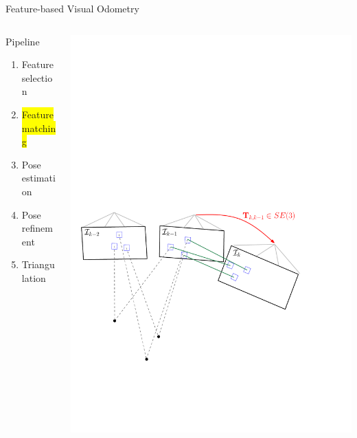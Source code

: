 \documentclass[10pt]{beamer}
\begin{document}
\begin{frame}{Feature-based Visual Odometry}
	\begin{columns}
	  \begin{column}{0.4\textwidth}
	  	\begin{block}{Pipeline}
		  	\begin{enumerate}
				\item Feature selection
				\item \colorbox{yellow}{Feature matching }
				\item Pose estimation
				\item Pose refinement
				\item Triangulation
			\end{enumerate}
		\end{block}
	  \end{column}
	  \begin{column}{0.6\textwidth}
	    \includegraphics[width=\textwidth]{img/vo_pipeline_4}

\end{column}
\end{columns}
\end{frame}
\end{document}
